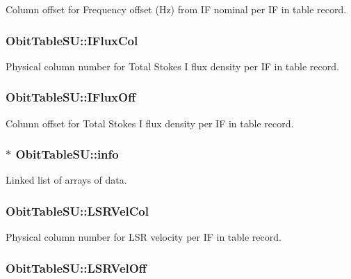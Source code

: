 Column offset for Frequency offset (Hz) from IF nominal per IF in table record. 

\subsubsection{ {\bf Obit\-Table\-SU::IFlux\-Col}}\label{structObitTableSU_o44}


Physical column number for Total Stokes I flux density per IF in table record. 

\subsubsection{ {\bf Obit\-Table\-SU::IFlux\-Off}}\label{structObitTableSU_o43}


Column offset for Total Stokes I flux density per IF in table record. 

\subsubsection{$\ast$ {\bf Obit\-Table\-SU::info}}\label{structObitTableSU_o5}


Linked list of arrays of data. 

\subsubsection{ {\bf Obit\-Table\-SU::LSRVel\-Col}}\label{structObitTableSU_o54}


Physical column number for LSR velocity per IF in table record. 

\subsubsection{ {\bf Obit\-Table\-SU::LSRVel\-Off}}\label{structObitTableSU_o53}



